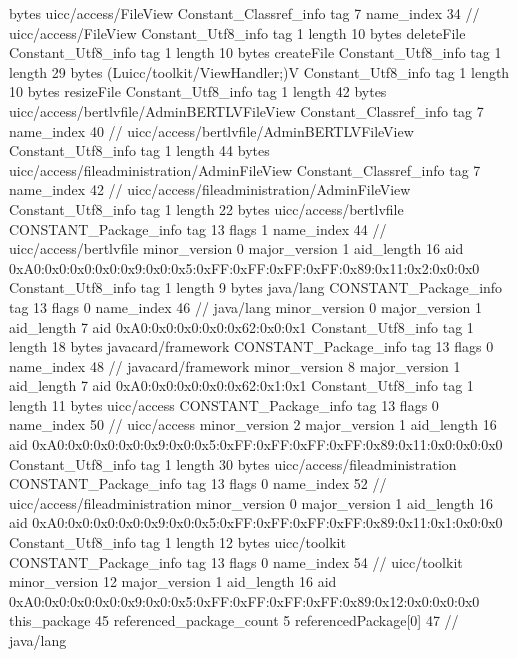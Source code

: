 {{{			bytes	uicc/access/FileView
		}
		Constant_Classref_info {
			tag	7
			name_index	34		// uicc/access/FileView
		}
		Constant_Utf8_info {
			tag	1
			length	10
			bytes	deleteFile
		}
		Constant_Utf8_info {
			tag	1
			length	10
			bytes	createFile
		}
		Constant_Utf8_info {
			tag	1
			length	29
			bytes	(Luicc/toolkit/ViewHandler;)V
		}
		Constant_Utf8_info {
			tag	1
			length	10
			bytes	resizeFile
		}
		Constant_Utf8_info {
			tag	1
			length	42
			bytes	uicc/access/bertlvfile/AdminBERTLVFileView
		}
		Constant_Classref_info {
			tag	7
			name_index	40		// uicc/access/bertlvfile/AdminBERTLVFileView
		}
		Constant_Utf8_info {
			tag	1
			length	44
			bytes	uicc/access/fileadministration/AdminFileView
		}
		Constant_Classref_info {
			tag	7
			name_index	42		// uicc/access/fileadministration/AdminFileView
		}
		Constant_Utf8_info {
			tag	1
			length	22
			bytes	uicc/access/bertlvfile
		}
		CONSTANT_Package_info {
			tag	13
			flags	1
			name_index	44		// uicc/access/bertlvfile
			minor_version	0
			major_version	1
			aid_length	16
			aid	0xA0:0x0:0x0:0x0:0x9:0x0:0x5:0xFF:0xFF:0xFF:0xFF:0x89:0x11:0x2:0x0:0x0
		}
		Constant_Utf8_info {
			tag	1
			length	9
			bytes	java/lang
		}
		CONSTANT_Package_info {
			tag	13
			flags	0
			name_index	46		// java/lang
			minor_version	0
			major_version	1
			aid_length	7
			aid	0xA0:0x0:0x0:0x0:0x62:0x0:0x1
		}
		Constant_Utf8_info {
			tag	1
			length	18
			bytes	javacard/framework
		}
		CONSTANT_Package_info {
			tag	13
			flags	0
			name_index	48		// javacard/framework
			minor_version	8
			major_version	1
			aid_length	7
			aid	0xA0:0x0:0x0:0x0:0x62:0x1:0x1
		}
		Constant_Utf8_info {
			tag	1
			length	11
			bytes	uicc/access
		}
		CONSTANT_Package_info {
			tag	13
			flags	0
			name_index	50		// uicc/access
			minor_version	2
			major_version	1
			aid_length	16
			aid	0xA0:0x0:0x0:0x0:0x9:0x0:0x5:0xFF:0xFF:0xFF:0xFF:0x89:0x11:0x0:0x0:0x0
		}
		Constant_Utf8_info {
			tag	1
			length	30
			bytes	uicc/access/fileadministration
		}
		CONSTANT_Package_info {
			tag	13
			flags	0
			name_index	52		// uicc/access/fileadministration
			minor_version	0
			major_version	1
			aid_length	16
			aid	0xA0:0x0:0x0:0x0:0x9:0x0:0x5:0xFF:0xFF:0xFF:0xFF:0x89:0x11:0x1:0x0:0x0
		}
		Constant_Utf8_info {
			tag	1
			length	12
			bytes	uicc/toolkit
		}
		CONSTANT_Package_info {
			tag	13
			flags	0
			name_index	54		// uicc/toolkit
			minor_version	12
			major_version	1
			aid_length	16
			aid	0xA0:0x0:0x0:0x0:0x9:0x0:0x5:0xFF:0xFF:0xFF:0xFF:0x89:0x12:0x0:0x0:0x0
		}
	}
	this_package	45
	referenced_package_count	5
	referencedPackage[0]	47		// java/lang
}
